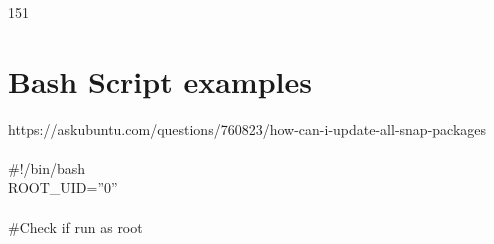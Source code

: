 \documentclass[10pt,a4paper]{article}
\begin{document}
{\\
\\
\\
\\
\\
\\
\\
\\
\\
\\
\\
\\
\\
\\
\\
\\
\\
\\
\\
\\
\\
\\
\\
\\
\\
\\
\\
\\
\\
\\
\\
\\
\\
\\
\\
\\
\\
\\
\\
\\
\\
\\
\\
\\
\\
\\
\\
}151
\hypertarget{bash_script_examples}{\section {Bash Script examples}}
https://askubuntu.com/questions/760823/how-can-i-update-all-snap-packages\\
\\
\#!/bin/bash\\
ROOT\_UID=''0''\\
\\
\#Check if run as root\\
\end{document}
